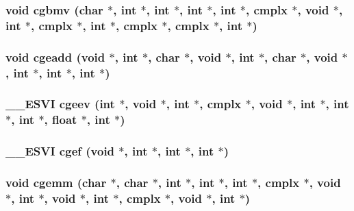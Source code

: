 \subsubsection{\setlength{\rightskip}{0pt plus 5cm}void cgbmv (char $\ast$, int $\ast$, int $\ast$, int $\ast$, int $\ast$, {\bf cmplx} $\ast$, void $\ast$, int $\ast$, {\bf cmplx} $\ast$, int $\ast$, {\bf cmplx} $\ast$, {\bf cmplx} $\ast$, int $\ast$)}\label{essl_8h_7903034fdaa0b6c55f588c20c9e03a81}


\subsubsection{\setlength{\rightskip}{0pt plus 5cm}void cgeadd (void $\ast$, int $\ast$, char $\ast$, void $\ast$, int $\ast$, char $\ast$, void $\ast$, int $\ast$, int $\ast$, int $\ast$)}\label{essl_8h_a89dbb51b380cb3bed3b0edc1a1d29e3}


\subsubsection{\setlength{\rightskip}{0pt plus 5cm}\_\-\_\-ESVI cgeev (int $\ast$, void $\ast$, int $\ast$, {\bf cmplx} $\ast$, void $\ast$, int $\ast$, int $\ast$, int $\ast$, float $\ast$, int $\ast$)}\label{essl_8h_70466844dbfde72f6f3c05aba742d1d9}


\subsubsection{\setlength{\rightskip}{0pt plus 5cm}\_\-\_\-ESVI cgef (void $\ast$, int $\ast$, int $\ast$, int $\ast$)}\label{essl_8h_d5eb39d1f309591fe5f06fd58a24b5db}


\subsubsection{\setlength{\rightskip}{0pt plus 5cm}void cgemm (char $\ast$, char $\ast$, int $\ast$, int $\ast$, int $\ast$, {\bf cmplx} $\ast$, void $\ast$, int $\ast$, void $\ast$, int $\ast$, {\bf cmplx} $\ast$, void $\ast$, int $\ast$)}\label{essl_8h_df0956c020cebf6dc4116d07242fe604}



